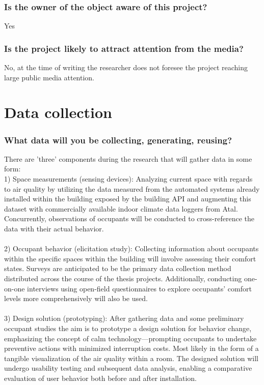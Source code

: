 \documentclass[a4paper]{article}
\begin{document}
\subsubsection{Is the owner of the object aware of this project?}
Yes

\subsubsection{Is the project likely to attract attention from the media?}
No, at the time of writing the researcher does not foresee the project reaching large public media attention.

\section{Data collection}

\subsubsection{What data will you be collecting, generating, reusing?}

There are 'three' components during the research that will gather data in some form: \\

1) Space measurements (sensing devices): Analyzing current space with regards to air quality by utilizing the data measured from the automated systems already installed within the building exposed by the building API and augmenting this dataset with commercially available indoor climate data loggers from Atal. Concurrently, observations of occupants will be conducted to cross-reference the data with their actual behavior. \\\\
2) Occupant behavior (elicitation study): Collecting information about occupants within the specific spaces within the building will involve assessing their comfort states. Surveys are anticipated to be the primary data collection method distributed across the course of the thesis projects. Additionally, conducting one-on-one interviews using open-field questionnaires to explore occupants’ comfort levels more comprehensively will also be used.\\\\
3) Design solution (prototyping): After gathering data and some preliminary occupant studies the aim is to prototype a design solution for behavior change, emphasizing the concept of calm technology—prompting occupants to undertake preventive actions with minimized interruption costs. Most likely in the form of a tangible visualization of the air quality within a room. The designed solution will undergo usability testing and subsequent data analysis, enabling a comparative evaluation of user behavior both before and after installation. \\
\end{document}
